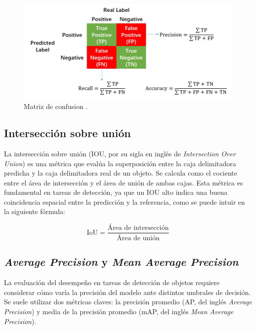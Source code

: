 \begin{figure}[htpb]
	\centering
	\includegraphics[scale=0.5]{./Figures/precision-recall-accuracy.png}
	\caption{Matriz de confusion \protect\footnotemark.}
	\label{fig:presicion-recall-accuracy}
\end{figure}


\subsection{Intersección sobre unión}

La intersección sobre unión (IOU, por su sigla en inglés de \textit{Intersection Over Union}) es una métrica que evalúa la superposición entre la caja delimitadora predicha y la caja delimitadora real de un objeto. Se calcula como el cociente entre el área de intersección y el área de unión de ambas cajas. Esta métrica es fundamental en tareas de detección, ya que un IOU alto indica una buena coincidencia espacial entre la predicción y la referencia, como se puede intuir en la siguiente fórmula:

\begin{equation}
	\text{IoU} = \frac{\text{Área de intersección}}{\text{Área de unión}}
	\label{eq:iou}
\end{equation}

\subsection{\textit{Average Precision} y \textit{Mean Average Precision}}

La evaluación del desempeño en tareas de detección de objetos requiere considerar cómo varía la precisión del modelo ante distintos umbrales de decisión. Se suele utilizar dos métricas claves: la precisión promedio (AP, del inglés \textit{Average Precision}) y media de la precisión promedio (mAP, del inglés \textit{Mean Average Precision}).

